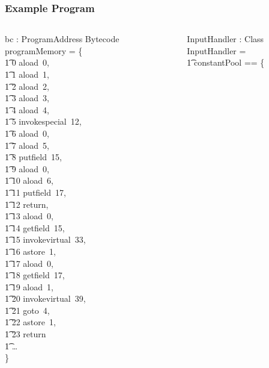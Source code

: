 \documentclass{beamer}
\begin{document}
\begin{frame}
  \frametitle{Example Program}
  \tiny
  \setlength{\zedleftsep}{0cm}
  \setlength{\zedindent}{0cm}
  \setlength{\zedtab}{0.3cm}
  \begin{columns}[c]
    \begin{axdef}
      bc : ProgramAddress \pfun Bytecode
    \where
      programMemory = \{ \\
      \t1 0 \mapsto aload~0, \\
      \t1 1 \mapsto aload~1, \\
      \t1 2 \mapsto aload~2, \\
      \t1 3 \mapsto aload~3, \\
      \t1 4 \mapsto aload~4, \\
      \t1 5 \mapsto invokespecial~12, \\
      \t1 6 \mapsto aload~0, \\
      \t1 7 \mapsto aload~5, \\
      \t1 8 \mapsto putfield~15, \\
      \t1 9 \mapsto aload~0, \\
      \t1 10 \mapsto aload~6, \\
      \t1 11 \mapsto putfield~17, \\
      \t1 12 \mapsto return, \\
      \t1 13 \mapsto aload~0, \\
      \t1 14 \mapsto getfield~15, \\
      \t1 15 \mapsto invokevirtual~33, \\
      \t1 16 \mapsto astore~1, \\
      \t1 17 \mapsto aload~0, \\
      \t1 18 \mapsto getfield~17, \\
      \t1 19 \mapsto aload~1, \\
      \t1 20 \mapsto invokevirtual~39, \\
      \t1 21 \mapsto goto~4, \\
      \t1 22 \mapsto astore~1, \\
      \t1 23 \mapsto return \\
      \t1 \dots \\
      \} 
    \end{axdef}
    \begin{axdef}
      InputHandler : Class
    \where
      InputHandler = \lblot \\
      \t1 constantPool == \{ \\

\end{axdef}
\end{columns}
\end{frame}
\end{document}
